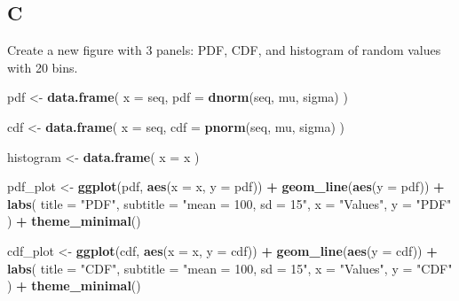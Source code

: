 \documentclass[
]{article}
\newenvironment{Shaded}{\begin{snugshade}}{\end{snugshade}}
\newcommand{\DataTypeTok}[1]{\textcolor[rgb]{0.13,0.29,0.53}{#1}}
\newcommand{\KeywordTok}[1]{\textcolor[rgb]{0.13,0.29,0.53}{\textbf{#1}}}
\newcommand{\NormalTok}[1]{#1}
\newcommand{\OperatorTok}[1]{\textcolor[rgb]{0.81,0.36,0.00}{\textbf{#1}}}
\newcommand{\StringTok}[1]{\textcolor[rgb]{0.31,0.60,0.02}{#1}}
\begin{document}
\hypertarget{c-2}{%
\subsection{C}\label{c-2}}

Create a new figure with 3 panels: PDF, CDF, and histogram of random
values with 20 bins.

\begin{Shaded}
\begin{Highlighting}[]
\NormalTok{pdf \textless{}{-}}\StringTok{ }\KeywordTok{data.frame}\NormalTok{(}
  \DataTypeTok{x =}\NormalTok{ seq,}
  \DataTypeTok{pdf =} \KeywordTok{dnorm}\NormalTok{(seq, mu, sigma)}
\NormalTok{)}

\NormalTok{cdf \textless{}{-}}\StringTok{ }\KeywordTok{data.frame}\NormalTok{(}
  \DataTypeTok{x =}\NormalTok{ seq,}
  \DataTypeTok{cdf =} \KeywordTok{pnorm}\NormalTok{(seq, mu, sigma)}
\NormalTok{)}

\NormalTok{histogram \textless{}{-}}\StringTok{ }\KeywordTok{data.frame}\NormalTok{(}
  \DataTypeTok{x =}\NormalTok{ x}
\NormalTok{)}

\NormalTok{pdf\_plot \textless{}{-}}\StringTok{ }\KeywordTok{ggplot}\NormalTok{(pdf, }\KeywordTok{aes}\NormalTok{(}\DataTypeTok{x =}\NormalTok{ x, }\DataTypeTok{y =}\NormalTok{ pdf)) }\OperatorTok{+}
\StringTok{  }\KeywordTok{geom\_line}\NormalTok{(}\KeywordTok{aes}\NormalTok{(}\DataTypeTok{y =}\NormalTok{ pdf)) }\OperatorTok{+}
\StringTok{  }\KeywordTok{labs}\NormalTok{(}
    \DataTypeTok{title =} \StringTok{"PDF"}\NormalTok{,}
    \DataTypeTok{subtitle =} \StringTok{"mean = 100, sd = 15"}\NormalTok{,}
    \DataTypeTok{x =} \StringTok{"Values"}\NormalTok{,}
    \DataTypeTok{y =} \StringTok{"PDF"}
\NormalTok{  ) }\OperatorTok{+}
\StringTok{  }\KeywordTok{theme\_minimal}\NormalTok{()}

\NormalTok{cdf\_plot \textless{}{-}}\StringTok{ }\KeywordTok{ggplot}\NormalTok{(cdf, }\KeywordTok{aes}\NormalTok{(}\DataTypeTok{x =}\NormalTok{ x, }\DataTypeTok{y =}\NormalTok{ cdf)) }\OperatorTok{+}
\StringTok{  }\KeywordTok{geom\_line}\NormalTok{(}\KeywordTok{aes}\NormalTok{(}\DataTypeTok{y =}\NormalTok{ cdf)) }\OperatorTok{+}
\StringTok{  }\KeywordTok{labs}\NormalTok{(}
    \DataTypeTok{title =} \StringTok{"CDF"}\NormalTok{,}
    \DataTypeTok{subtitle =} \StringTok{"mean = 100, sd = 15"}\NormalTok{,}
    \DataTypeTok{x =} \StringTok{"Values"}\NormalTok{,}
    \DataTypeTok{y =} \StringTok{"CDF"}
\NormalTok{  ) }\OperatorTok{+}
\StringTok{  }\KeywordTok{theme\_minimal}\NormalTok{()}


\end{Highlighting}
\end{Shaded}
\end{document}
